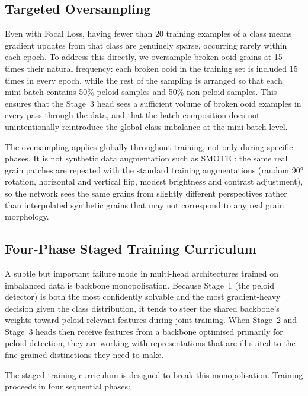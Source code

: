 \documentclass[a4paper,fleqn]{cas-dc}
\begin{document}
\subsection{Targeted Oversampling}
\label{sec:oversampling}
Even with Focal Loss, having fewer than 20 training examples of a class means gradient updates from that class are genuinely sparse, occurring rarely within each epoch. To address this directly, we oversample broken ooid grains at 15 times their natural frequency: each broken ooid in the training set is included 15 times in every epoch, while the rest of the sampling is arranged so that each mini-batch contains 50\% peloid samples and 50\% non-peloid samples. This ensures that the Stage~3 head sees a sufficient volume of broken ooid examples in every pass through the data, and that the batch composition does not unintentionally reintroduce the global class imbalance at the mini-batch level.

The oversampling applies globally throughout training, not only during specific phases. It is not synthetic data augmentation such as SMOTE \citep{chawla2002smote}: the same real grain patches are repeated with the standard training augmentations (random 90° rotation, horizontal and vertical flip, modest brightness and contrast adjustment), so the network sees the same grains from slightly different perspectives rather than interpolated synthetic grains that may not correspond to any real grain morphology.

\subsection{Four-Phase Staged Training Curriculum}
\label{sec:staged_training}
A subtle but important failure mode in multi-head architectures trained on imbalanced data is backbone monopolisation. Because Stage~1 (the peloid detector) is both the most confidently solvable and the most gradient-heavy decision given the class distribution, it tends to steer the shared backbone's weights toward peloid-relevant features during joint training. When Stage~2 and Stage~3 heads then receive features from a backbone optimised primarily for peloid detection, they are working with representations that are ill-suited to the fine-grained distinctions they need to make.

The staged training curriculum is designed to break this monopolisation. Training proceeds in four sequential phases:
\end{document}
